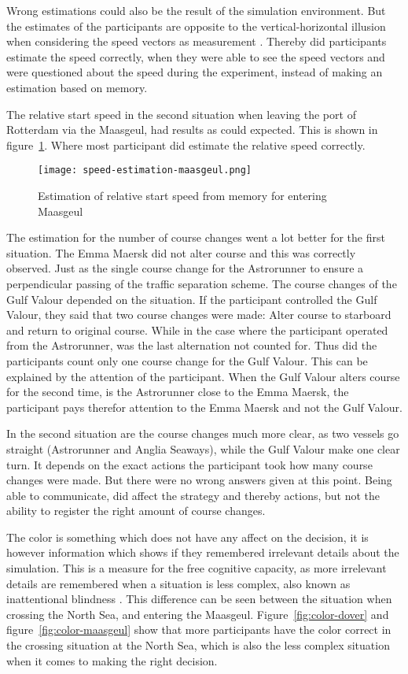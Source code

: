 Wrong estimations could also be the result of the simulation environment. But the estimates of the participants are opposite to the vertical-horizontal illusion when considering the speed vectors as measurement \cite{Prinzmetal1993}. Thereby did participants estimate the speed correctly, when they were able to see the speed vectors and were questioned about the speed during the experiment, instead of making an estimation based on memory.

The relative start speed in the second situation when leaving the port of Rotterdam via the Maasgeul, had results as could expected. This is shown in figure~\ref{fig:speed-estimation-maasgeul}. Where most participant did estimate the relative speed correctly.

\begin{figure}[h]
	\centering
	\texttt{[image: speed-estimation-maasgeul.png]}
	\caption{Estimation of relative start speed from memory for entering Maasgeul}
	\label{fig:speed-estimation-maasgeul}
\end{figure}

The estimation for the number of course changes went a lot better for the first situation. The Emma Maersk did not alter course and this was correctly observed. Just as the single course change for the Astrorunner to ensure a perpendicular passing of the traffic separation scheme. The course changes of the Gulf Valour depended on the situation. If the participant controlled the Gulf Valour, they said that two course changes were made: Alter course to starboard and return to original course. While in the case where the participant operated from the Astrorunner, was the last alternation not counted for. Thus did the participants count only one course change for the Gulf Valour. This can be explained by the attention of the participant. When the Gulf Valour alters course for the second time, is the Astrorunner close to the Emma Maersk, the participant pays therefor attention to the Emma Maersk and not the Gulf Valour.

In the second situation are the course changes much more clear, as two vessels go straight (Astrorunner and Anglia Seaways), while the Gulf Valour make one clear turn. It depends on the exact actions the participant took how many course changes were made. But there were no wrong answers given at this point. 
Being able to communicate, did affect the strategy and thereby actions, but not the ability to register the right amount of course changes.

The color is something which does not have any affect on the decision, it is however information which shows if they remembered irrelevant details about the simulation. This is a measure for the free cognitive capacity, as more irrelevant details are remembered when a situation is less complex, also known as inattentional blindness \cite{Most2000}. This difference can be seen between the situation when crossing the North Sea, and entering the Maasgeul. Figure~\ref{fig:color-dover} and figure~\ref{fig:color-maasgeul} show that more participants have the color correct in the crossing situation at the North Sea, which is also the less complex situation when it comes to making the right decision. 

